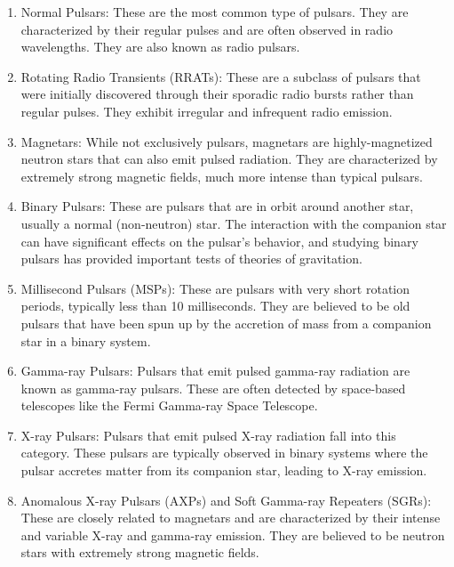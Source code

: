 \begin{enumerate}
    \item Normal Pulsars: These are the most common type of pulsars. They are characterized by their regular pulses and are often observed in radio wavelengths. They are also known as radio pulsars. %

    \item Rotating Radio Transients (RRATs): These are a subclass of pulsars that were initially discovered through their sporadic radio bursts rather than regular pulses. They exhibit irregular and infrequent radio emission.

    \item Magnetars: While not exclusively pulsars, magnetars are highly-magnetized neutron stars that can also emit pulsed radiation. They are characterized by extremely strong magnetic fields, much more intense than typical pulsars.

    \item Binary Pulsars: These are pulsars that are in orbit around another star, usually a normal (non-neutron) star. The interaction with the companion star can have significant effects on the pulsar's behavior, and studying binary pulsars has provided important tests of theories of gravitation.

    \item Millisecond Pulsars (MSPs): These are pulsars with very short rotation periods, typically less than 10 milliseconds. They are believed to be old pulsars that have been spun up by the accretion of mass from a companion star in a binary system.

    \item Gamma-ray Pulsars: Pulsars that emit pulsed gamma-ray radiation are known as gamma-ray pulsars. These are often detected by space-based telescopes like the Fermi Gamma-ray Space Telescope.

    \item X-ray Pulsars: Pulsars that emit pulsed X-ray radiation fall into this category. These pulsars are typically observed in binary systems where the pulsar accretes matter from its companion star, leading to X-ray emission.

    \item Anomalous X-ray Pulsars (AXPs) and Soft Gamma-ray Repeaters (SGRs): These are closely related to magnetars and are characterized by their intense and variable X-ray and gamma-ray emission. They are believed to be neutron stars with extremely strong magnetic fields.
\end{enumerate}

